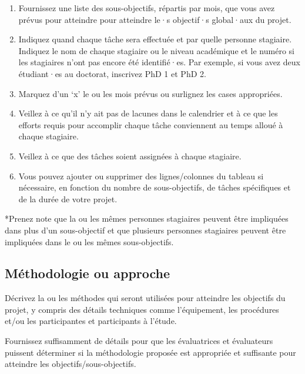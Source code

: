 \documentclass{mitacs-acceleration}
\begin{document}
\begin{instructions}
\begin{enumerate}
\item  Fournissez une liste des sous-objectifs, répartis par mois, que vous avez prévus pour atteindre pour atteindre le·s objectif·s global·aux du projet.
\item  Indiquez quand chaque tâche sera effectuée et par quelle personne stagiaire. Indiquez le nom de chaque stagiaire ou le niveau académique et le numéro si les stagiaires n'ont pas encore été identifié·es. Par exemple, si vous avez deux étudiant·es au doctorat, inscrivez \og{}PhD 1\fg{} et \og{}PhD 2\fg{}. 
\item  Marquez d'un ‘x' le ou les mois prévus ou surlignez les cases appropriées. 
\item  Veillez à ce qu'il n'y ait pas de lacunes dans le calendrier et à ce que les efforts requis pour accomplir chaque tâche conviennent au temps alloué à chaque stagiaire.
\item  Veillez à ce que des tâches soient assignées à chaque stagiaire.
\item  Vous pouvez ajouter ou supprimer des lignes/colonnes du tableau si nécessaire, en fonction du nombre de sous-objectifs, de tâches spécifiques et de la durée de votre projet.
\end{enumerate}
*Prenez note que la ou les mêmes personnes stagiaires peuvent être impliquées dans plus d'un sous-objectif et que plusieurs personnes stagiaires peuvent être impliquées dans le ou les mêmes sous-objectifs.
\end{instructions}


\toportrait

\subsection{Méthodologie ou approche} %

\begin{instructions}
Décrivez la ou les méthodes qui seront utilisées pour atteindre les objectifs du projet, y compris des détails techniques comme l'équipement, les procédures et/ou les participantes et participants à l'étude. 

Fournissez suffisamment de détails pour que les évaluatrices et évaluateurs puissent déterminer si la méthodologie proposée est appropriée et suffisante pour atteindre les objectifs/sous-objectifs.
\end{instructions}
\end{document}
